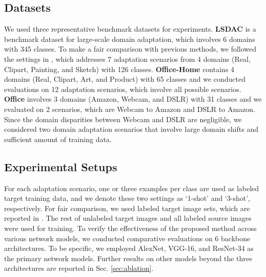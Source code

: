 \documentclass[a4paper,conference]{IEEEtran}
\begin{document}
\subsection{Datasets}
We used three representative benchmark datasets for experiments. \textbf{LSDAC}\cite{peng2019moment} is a benchmark dataset for large-scale domain adaptation, which involves 6 domains with 345 classes. To make a fair comparison with previous methods, we followed the settings in \cite{saito2019mme}, which addresses 7 adaptation scenarios from 4 domains (Real, Clipart, Painting, and Sketch) with 126 classes. \textbf{Office-Home}\cite{venkateswara2017deep} contains 4 domains (Real, Clipart, Art, and Product) with 65 classes and we conducted evaluations on 12 adaptation scenarios, which involve all possible scenarios. \textbf{Office}\cite{saenko2010adapting} involves 3 domains (Amazon, Webcam, and DSLR) with 31 classes and we evaluated on 2 scenarios, which are Webcam to Amazon and DSLR to Amazon. Since the domain disparities between Webcam and DSLR are negligible, we considered two domain adaptation scenarios that involve large domain shifts and sufficient amount of training data.







\subsection{Experimental Setups}
For each adaptation scenario, one or three examples per class are used as labeled target training data, and we denote these two settings as `1-shot' and `3-shot', respectively. For fair comparison, we used labeled target image sets, which are reported in \cite{saito2019mme}. The rest of unlabeled target images and all labeled source images were used for training. To verify the effectiveness of the proposed method across various network models, we conducted comparative evaluations on 6 backbone architectures. To be specific, we employed AlexNet\cite{alex2012alexnet}, VGG-16\cite{vggnet}, and ResNet-34\cite{resnet} as the primary network models. Further results on other models beyond the three architectures are reported in Sec. \ref{sec:ablation}.



\renewcommand{\algorithmicrequire}{\textbf{Input:}}
\renewcommand{\algorithmicensure}{\textbf{Output:}}
\end{document}
